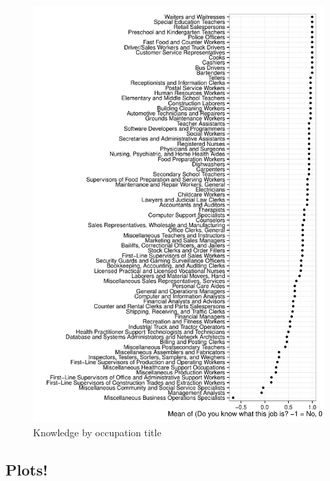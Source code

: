 \documentclass[11pt]{article}
\begin{document}
\begin{figure}
\caption{Knowledge by occupation title} 
\centering
\begin{minipage}{0.85 \linewidth}
\includegraphics[width = \linewidth]{./plots/knowledge_by_occupation.pdf}
\end{minipage}  
\end{figure} 





\subsection{Plots!}
\end{document}
